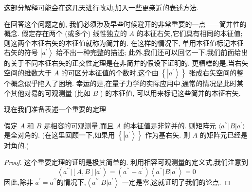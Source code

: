 \documentclass[lang=cn,newtx,10pt,scheme=chinese,thmcnt=section]{elegantbook}
\begin{document}
\begin{remark}
	这部分解释可能会在这几天进行改动,加入一些更亲近的表述方法.
\end{remark}

在回答这个问题之前, 我们必须涉及早些时候避开的非常重要的一点——简并性的概念. 假定存在两个 (或多个) 线性独立的 $A$ 的本征右矢,它们具有相同的本征值; 则这两个本征右矢的本征值就称为简并的. 在这样的情况下, 单用本征值标记本征右矢的符号 $\left| {a}^{\prime }\right\rangle$ 给不出一种完整的描述; 此外,我们还可以回忆一下,我们前面给出的关于不同本征右矢的正交性定理是在非简并的假设下证明的. 更糟糕的是,当右矢空间的维数大于 $A$ 的可区分本征值的个数时,这个由 $\left\{ \left| {a}^{\prime }\right\rangle \right\}$ 张成右矢空间的整个概念似乎陷入了困境. 幸运的是,在量子力学的实际应用中,通常的情况是此时某个其他对易的可观测量 (比如 $B$ ) 的本征值, 可以用来标记这些简并的本征右矢.

现在我们准备表述一个重要的定理
\begin{theorem}\label{thm:1.3.1} 
	假定 $A$ 和 $B$ 是相容的可观测量,而且 $A$ 的本征值是非简并的. 则矩阵元 $\langle {a}^{\prime \prime } \left| B\right| {a}^{\prime }\rangle$ 是全对角的. (在这里回顾一下,如果用 $\left\{ \left| {a}^{\prime }\right\rangle \right\}$ 作为基右矢. 则 $A$ 的矩阵元已经是对角的.)
\end{theorem}

\begin{proof}
	这个重要定理的证明是极其简单的. 利用相容可观测量的定义式,我们注意到
	\begin{equation}
		\left\langle {{a}^{\prime \prime }\left| \left\lbrack {A, B}\right\rbrack \right| {a}^{\prime }}\right\rangle = \left( {{a}^{\prime \prime } - {a}^{\prime }}\right) \left\langle {{a}^{\prime \prime }\left| B\right| {a}^{\prime }}\right\rangle = 0
	\end{equation}
	因此,除非 ${a}^{\prime } = {a}^{\prime \prime }$的情况下,$\left\langle {{a}^{\prime \prime }\left| B\right| {a}^{\prime }}\right\rangle$ 一定是零,这就证明了我们的论点.
\end{proof}
\end{document}
